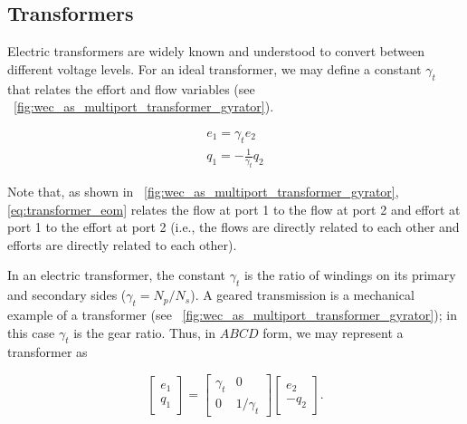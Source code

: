 \documentclass[lettersize,journal]{IEEEtran}
\begin{document}
\subsection{Transformers}\label{sec:trasnformers}
Electric transformers are widely known and understood to convert between different voltage levels.
For an ideal transformer, we may define a constant $\gamma_{t}$ that relates the effort and flow variables (see \figurename~\ref{fig:wec_as_multiport_transformer_gyrator}).

\begin{subequations}
        \begin{align}
               e_1 = \gamma_{t} e_2 \\
               q_1 = -\frac{1}{\gamma_t} q_2
        \end{align}
        \label{eq:transformer_eom}
\end{subequations}

\noindent{}Note that, as shown in \figurename~\ref{fig:wec_as_multiport_transformer_gyrator}, \eqref{eq:transformer_eom} relates the flow at port 1 to the flow at port 2 and effort at port 1 to the effort at port 2 (i.e., the flows are directly related to each other and efforts are directly related to each other).

In an electric transformer, the constant $\gamma_t$ is the ratio of windings on its primary and secondary sides ($\gamma_t=N_p/N_s$).
A geared transmission is a mechanical example of a transformer (see \figurename~\ref{fig:wec_as_multiport_transformer_gyrator}); in this case $\gamma_{t}$ is the gear ratio.
Thus, in $ABCD$ form, we may represent a transformer as

\begin{equation}
        \begin{bmatrix}
                e_1 \\ q_1
        \end{bmatrix}
        =
        \begin{bmatrix}
                \gamma_{t} & 0 \\ 0 & 1/\gamma_{t}
        \end{bmatrix}
        \begin{bmatrix}
                e_2 \\ - q_2
        \end{bmatrix} .
        \label{eq:transformer_abcd}
\end{equation}
\end{document}
